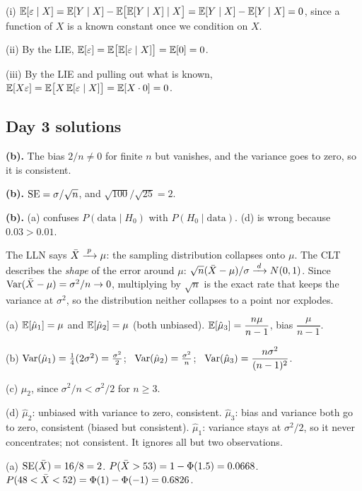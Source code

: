 \documentclass[11pt]{article}
\begin{document}
(i) $\mathbb{E}[\varepsilon\mid X]=\mathbb{E}[Y\mid X]-\mathbb{E}\big[\mathbb{E}[Y\mid X]\mid X\big]=\mathbb{E}[Y\mid X]-\mathbb{E}[Y\mid X]=0$, since a function of $X$ is a known constant once we condition on $X$.

(ii) By the LIE, $\mathbb{E}[\varepsilon]=\mathbb{E}\big[\mathbb{E}[\varepsilon\mid X]\big]=\mathbb{E}[0]=0$.

(iii) By the LIE and pulling out what is known, $\mathbb{E}[X\varepsilon]=\mathbb{E}\big[X\,\mathbb{E}[\varepsilon\mid X]\big]=\mathbb{E}[X\cdot0]=0$.

\subsection{Day 3 solutions}

 \textbf{(b).} The bias $2/n\neq0$ for finite $n$ but vanishes, and the variance goes to zero, so it is consistent.

 \textbf{(b).} $\operatorname{SE}=\sigma/\sqrt n$, and $\sqrt{100}/\sqrt{25}=2$.

 \textbf{(b).} (a) confuses $P(\text{data}\mid H_0)$ with $P(H_0\mid\text{data})$. (d) is wrong because $0.03>0.01$.

 The LLN says $\bar{X}\xrightarrow{\;p\;}\mu$: the sampling distribution collapses onto $\mu$. The CLT describes the \emph{shape} of the error around $\mu$: $\sqrt n(\bar{X}-\mu)/\sigma\xrightarrow{\;d\;} N(0,1)$. Since $\operatorname{Var}(\bar{X}-\mu)=\sigma^2/n\to0$, multiplying by $\sqrt n$ is the exact rate that keeps the variance at $\sigma^2$, so the distribution neither collapses to a point nor explodes.

(a) $\mathbb{E}[\hat\mu_1]=\mu$ and $\mathbb{E}[\hat\mu_2]=\mu$ (both unbiased). $\mathbb{E}[\hat\mu_3]=\dfrac{n\mu}{n-1}$, bias $\dfrac{\mu}{n-1}$.

(b) $\operatorname{Var}(\hat\mu_1)=\tfrac14(2\sigma^2)=\tfrac{\sigma^2}{2}$; \ $\operatorname{Var}(\hat\mu_2)=\tfrac{\sigma^2}{n}$; \ $\operatorname{Var}(\hat\mu_3)=\dfrac{n\sigma^2}{(n-1)^2}$.

(c) $\hat\mu_2$, since $\sigma^2/n<\sigma^2/2$ for $n\ge3$.

(d) $\hat\mu_2$: unbiased with variance to zero, consistent. $\hat\mu_3$: bias and variance both go to zero, consistent (biased but consistent). $\hat\mu_1$: variance stays at $\sigma^2/2$, so it never concentrates; not consistent. It ignores all but two observations.

(a) $\operatorname{SE}(\bar{X})=16/8=2$. $P(\bar{X}>53)=1-\Phi(1.5)=0.0668$. $P(48<\bar{X}<52)=\Phi(1)-\Phi(-1)=0.6826$.
\end{document}
